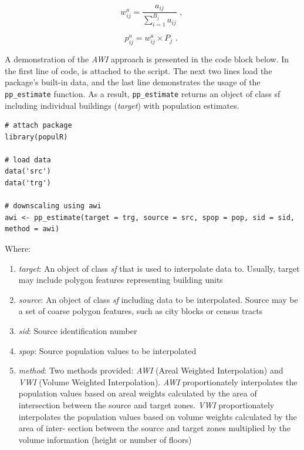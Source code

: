 \begin{equation} 
  w_{ij}^a = \frac{a_{ij}}{\sum_{i=1}^{B_{j}} a_{ij}} \text{ , }
  \label{eq:eq1}
\end{equation}

\begin{equation}
    p_{ij}^a = w_{ij}^a \times P_j \text{ . }
    \label{eq:eq2}
\end{equation}

A demonstration of the \emph{AWI} approach is presented in the code block below. In the first line of code,
 is attached to the script. The next two lines load the package's built-in data, and the last line
demonstrates the usage of the \texttt{pp\_estimate} function. As a result, \texttt{pp\_estimate} returns an object
of class sf including individual buildings (\emph{target}) with population estimates.

\begin{verbatim}
# attach package
library(populR)

# load data
data('src')
data('trg')

# downscaling using awi
awi <- pp_estimate(target = trg, source = src, spop = pop, sid = sid,
method = awi)
\end{verbatim}

Where:

\begin{enumerate}
\def\labelenumi{\arabic{enumi}.}
\tightlist
\item
  \emph{target}: An object of class \emph{sf} that is used to interpolate data to. Usually, target may include
  polygon features representing building units
\item
  \emph{source}: An object of class \emph{sf} including data to be interpolated. Source may be a set of coarse
  polygon features, such as city blocks or census tracts
\item
  \emph{sid}: Source identification number
\item
  \emph{spop}: Source population values to be interpolated
\item
  \emph{method}: Two methods provided: \emph{AWI} (Areal Weighted Interpolation) and \emph{VWI} (Volume Weighted
  Interpolation). \emph{AWI} proportionately interpolates the population values based on areal weights
  calculated by the area of intersection between the source and target zones. \emph{VWI} proportionately
  interpolates the population values based on volume weights calculated by the area of inter-
  section between the source and target zones multiplied by the volume information (height or
  number of floors)
\end{enumerate}

